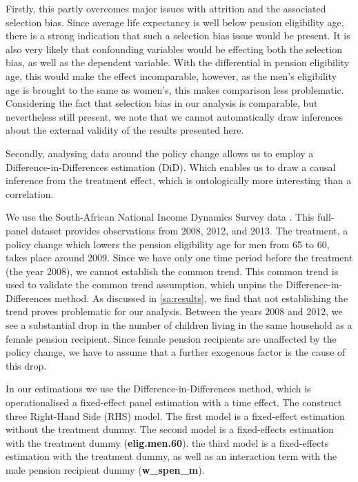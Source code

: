 \begin{refsection}
Firstly, this partly overcomes major issues with attrition and the associated selection bias.
Since average life expectancy is well below pension eligibility age,
there is a strong indication that such a selection bias issue would be present.
It is also very likely that confounding variables would be effecting both the selection bias, as well as the dependent variable.
With the differential in pension eligibility age, this would make the effect incomparable,
however, as the men's eligibility age is brought to the same as women's, this makes comparison less problematic.
Considering the fact that selection bias in our analysis is comparable, but nevertheless still present,
we note that we cannot automatically draw inferences about the external validity of the results presented here.

Secondly, analysing data around the policy change allows us to employ a Difference-in-Differences estimation (DiD).
Which enables us to draw a causal inference from the treatment effect,
which is ontologically more interesting than a correlation.

We use the South-African National Income Dynamics Survey data
\parencite[in collaboration with The World Bank]{saldru2008nids,saldru2012nids,saldru2013nids}.
This full-panel dataset provides observations from 2008, 2012, and 2013.
The treatment, a policy change which lowers the pension eligibility age for men from 65 to 60, takes place around 2009.
Since we have only one time period before the treatment (the year 2008), we cannot establish the common trend.
This common trend is used to validate the common trend assumption, which unpins the Difference-in-Differences method.
As discussed in \autoref{sa:results}, we find that not establishing the trend proves problematic for our analysis.
Between the years 2008 and 2012,
we see a substantial drop in the number of children living in the same household as a female pension recipient.
Since female pension recipients are unaffected by the policy change, we have to assume that a further exogenous factor is the cause of this drop.

In our estimations we use the Difference-in-Differences method,
which is operationalised a fixed-effect panel estimation with a time effect.
The construct three Right-Hand Side (RHS) model.
The first model is a fixed-effect estimation without the treatment dummy.
The second model is a fixed-effects estimation with the treatment dummy (\textbf{elig.men.60}).
the third model is a fixed-effects estimation with the treatment dummy,
as well as an interaction term with the male pension recipient dummy (\textbf{w\_spen\_m}).


\end{refsection}
